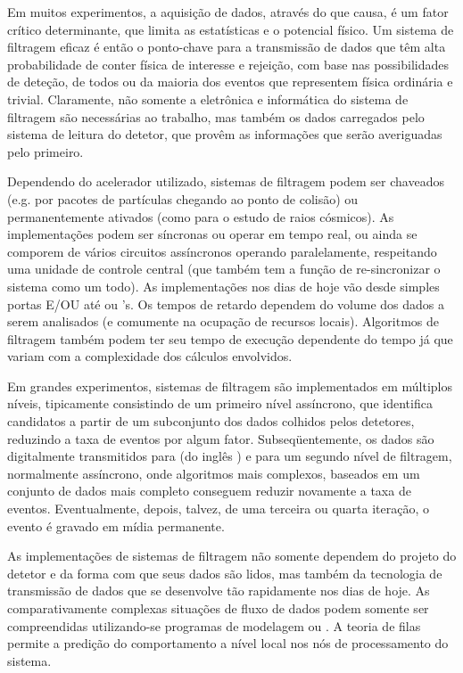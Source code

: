 Em muitos experimentos, a aquisição de dados, através do  que
causa, é um fator crítico determinante, que limita as estatísticas e o
potencial físico. Um sistema de filtragem eficaz é então o ponto-chave para a
transmissão de dados que têm alta probabilidade de conter física de interesse
e rejeição, com base nas possibilidades de deteção, de todos ou da maioria dos
eventos que representem física ordinária e trivial. Claramente, não somente a
eletrônica e informática do sistema de filtragem são necessárias ao trabalho,
mas também os dados carregados pelo sistema de leitura do detetor, que provêm
as informações que serão averiguadas pelo primeiro.

Dependendo do acelerador utilizado, sistemas de filtragem podem ser chaveados
(e.g. por pacotes de partículas chegando ao ponto de colisão) ou
permanentemente ativados (como para o estudo de raios cósmicos). As
implementações podem ser síncronas ou operar em tempo real, ou ainda
se comporem de vários circuitos assíncronos operando paralelamente,
respeitando uma unidade de controle central (que também tem a função de
re-sincronizar o sistema como um todo). As implementações nos dias de hoje vão
desde simples portas E/OU até  ou
's. Os tempos de retardo dependem do volume dos dados a serem
analisados (e comumente na ocupação de recursos locais). Algoritmos de
filtragem também podem ter seu tempo de execução dependente do tempo já que
variam com a complexidade dos cálculos envolvidos.

Em grandes experimentos, sistemas de filtragem são implementados em múltiplos
níveis, tipicamente consistindo de um primeiro nível assíncrono, que identifica
candidatos a partir de um subconjunto dos dados colhidos pelos detetores,
reduzindo a taxa de eventos por algum fator. Subseqüentemente, os dados são
digitalmente transmitidos para  (do inglês
) e para um segundo nível de filtragem, normalmente assíncrono,
onde algoritmos mais complexos, baseados em um conjunto de dados mais completo
conseguem reduzir novamente a taxa de eventos. Eventualmente, depois, talvez,
de uma terceira ou quarta iteração, o evento é gravado em mídia permanente.

As implementações de sistemas de filtragem não somente dependem do projeto do
detetor e da forma com que seus dados são lidos, mas também da tecnologia de
transmissão de dados que se desenvolve tão rapidamente nos dias de hoje. As
comparativamente complexas situações de fluxo de dados podem somente ser
compreendidas utilizando-se programas de modelagem ou . A teoria de filas permite a predição do comportamento a nível local
nos nós de processamento do sistema.

